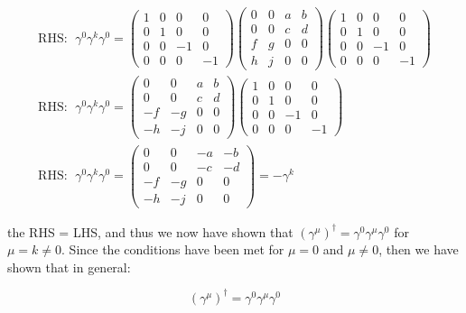 \documentclass[11pt]{article}
\theoremstyle{definition}
\begin{document}
\begin{align*}
    \text{RHS: }\; \gamma^{0}\gamma^{k}\gamma^{0}
    =
    \begin{pmatrix}1&0&0&0\\ 0&1&0&0\\ 0&0&-1&0\\ 0&0&0&-1 \end{pmatrix}
    \begin{pmatrix}
        0&0&a&b\\ 
        0&0&c&d\\ 
        f&g&0&0\\ 
        h&j&0&0\end{pmatrix}
    \begin{pmatrix}1&0&0&0\\ 0&1&0&0\\ 0&0&-1&0\\ 0&0&0&-1 \end{pmatrix}\\
    \text{RHS: }\; \gamma^{0}\gamma^{k}\gamma^{0}
    =
    \begin{pmatrix}0&0&a&b\\ 0&0&c&d\\ -f&-g&0&0\\ -h&-j&0&0\end{pmatrix}
    \begin{pmatrix}1&0&0&0\\ 0&1&0&0\\ 0&0&-1&0\\ 0&0&0&-1\end{pmatrix}\\
    \text{RHS: }\; \gamma^{0}\gamma^{k}\gamma^{0}
    =
    \begin{pmatrix}0&0&-a&-b\\ 0&0&-c&-d\\ -f&-g&0&0\\ -h&-j&0&0\end{pmatrix}
    = - \gamma^{k}
\end{align*}

the RHS = LHS, and thus we now have shown that $(\gamma^{\mu})^{\dagger} = \gamma^{0} \gamma^{\mu} \gamma^{0}$ for $\mu=k \neq 0$. Since the conditions have been met for $\mu=0$ and $\mu \neq 0$, then we have shown that in general:

\begin{equation*}
\boxed{
    (\gamma^{\mu})^{\dagger} = \gamma^{0} \gamma^{\mu} \gamma^{0}
}
\end{equation*}
\end{document}
